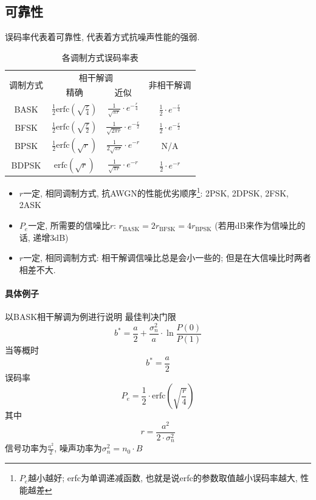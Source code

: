 \documentclass[a4paper]{report}
\begin{document}
\subsection{可靠性}
误码率代表着可靠性, 代表着方式抗噪声性能的强弱. 
\begin{table}[H]
  \centering
    \begin{tabular}{|c|cc|c}
    \multirow{2}[0]{*}{调制方式} & \multicolumn{2}{c}{相干解调} & \multirow{2}[0]{*}{非相干解调} \\
          & 精确    & 近似    &  \\
    BASK  &    $\frac{1}{2}\text{erfc}(\sqrt{\frac{r}{4}})$   &   $\frac{1}{\sqrt{\pi r}}\cdot e^{-\frac{r}{4}}$    & $\frac{1}{2}\cdot e^{-\frac{r}{4}}$ \\
    BFSK  &    $\frac{1}{2}\text{erfc}(\sqrt{\frac{r}{2}})$   &   $\frac{1}{\sqrt{2\pi r}}\cdot e^{-\frac{r}{2}}$    &  $\frac{1}{2}\cdot e^{-\frac{r}{2}}$\\
    BPSK  &    $\frac{1}{2}\text{erfc}(\sqrt{r})$   &   $\frac{1}{2\sqrt{\pi r}}\cdot e^{-r}$    & N/A \\
    BDPSK &    $\text{erfc}(\sqrt{r})$   &    $\frac{1}{\sqrt{\pi r}}\cdot e^{-r}$   & $\frac{1}{2}\cdot e^{-r}$ \\
    \end{tabular}%
  \caption{各调制方式误码率表}
\end{table}%
\begin{itemize}
  \item $r$一定, 相同调制方式, 抗AWGN的性能优劣顺序\footnote{$P_e$越小越好; erfc为单调递减函数, 也就是说erfc的参数取值越小误码率越大, 性能越差}: 2PSK, 2DPSK, 2FSK, 2ASK
  \item $P_e$一定, 所需要的信噪比$r$: $r_\text{BASK}=2r_\text{BFSK}=4r_\text{BPSK}$ (若用dB来作为信噪比的话, 递增3dB)
  \item $r$一定, 相同调制方式: 相干解调信噪比总是会小一些的; 但是在大信噪比时两者相差不大. 
\end{itemize}


\paragraph{具体例子}
以BASK相干解调为例进行说明
最佳判决门限
\begin{equation}
  b^*=\frac{a}{2}+\frac{\sigma^2_n}{a}\cdot \ln{\frac{P(0)}{P(1)}}
\end{equation}
当等概时
\begin{equation}
  b^*=\frac{a}{2}
\end{equation}
误码率
\begin{equation}
  P_e=\frac{1}{2}\cdot \text{erfc}(\sqrt{\frac{r}{4}})
\end{equation}
其中
\begin{equation}
  r=\frac{a^2}{2\cdot \sigma^2_n}
\end{equation}
信号功率为$\frac{a^2}{2}$, 噪声功率为$\sigma^2_n=n_0\cdot B$
\end{document}
